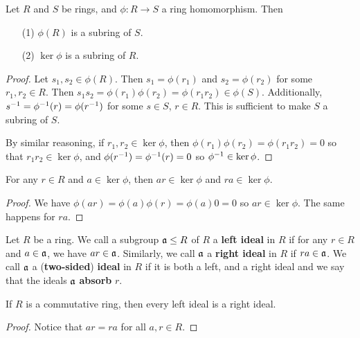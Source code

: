 \begin{lemma}\label{lemma_5.3.1}
  Let $R$ and $S$ be rings, and $\phi:R \xrightarrow{} S$ a ring homomorphism.
  Then
  \begin{enumerate}
    \item[(1)] $\phi(R)$ is a subring of $S$.

    \item[(2)] $\ker{\phi}$ is a subring of $R$.
  \end{enumerate}
\end{lemma}
\begin{proof}
  Let $s_1,s_2 \in \phi(R)$. Then $s_1=\phi(r_1)$ and $s_2=\phi(r_2)$ for some
  $r_1,r_2 \in R$. Then $s_1s_2=\phi(r_1)\phi(r_2)=\phi(r_1r_2) \in \phi(S)$.
  Additionally, $s^{-1}=\phi^{-1}(r)=\phi(r^{-1})$ for some $s \in S$,  $r
  \in R$. This is sufficient to make  $S$ a subring of  $S$.

  By similar reasoning, if $r_1,r_2 \in \ker{\phi}$, then
  $\phi(r_1)\phi(r_2)=\phi(r_1r_2)=0$ so that $r_1r_2 \in \ker{\phi}$, and
  $\phi(r^{-1})=\phi^{-1}(r)=0$ so $\phi^{-1}\in \ker{\phi}$.
\end{proof}
\begin{corollary}
  For any $r \in R$ and  $a \in \ker{\phi}$, then $ar \in \ker{\phi}$ and $ra
  \in \ker{\phi}$.
\end{corollary}
\begin{proof}
  We have $\phi(ar)=\phi(a)\phi(r)=\phi(a)0=0$ so $ar \in \ker{\phi}$. The
  same happens for $ra$.
\end{proof}

\begin{definition}
  Let $R$ be a ring. We call a subgroup $\mathfrak{a} \leq R$ of $R$ a \textbf{left
  ideal} in $R$ if for any $r \in R$ and $a \in \mathfrak{a}$, we have  $ar
  \in \mathfrak{a}$. Similarly, we call  $\mathfrak{a}$ a  \textbf{right ideal} in $R$ if
  $ra \in \mathfrak{a}$. We call  $\mathfrak{a}$ a  (\textbf{two-sided}) \textbf{ideal} in
  $R$ if it is both a left, and a right ideal and we say that the ideals
  $\mathfrak{a}$ \textbf{absorb} $r$.
\end{definition}

\begin{lemma}\label{lemma_5.3.2}
  If $R$ is a commutative ring, then every left ideal is a right ideal.
\end{lemma}
\begin{proof}
  Notice that $ar=ra$ for all  $a,r \in R$.
\end{proof}

